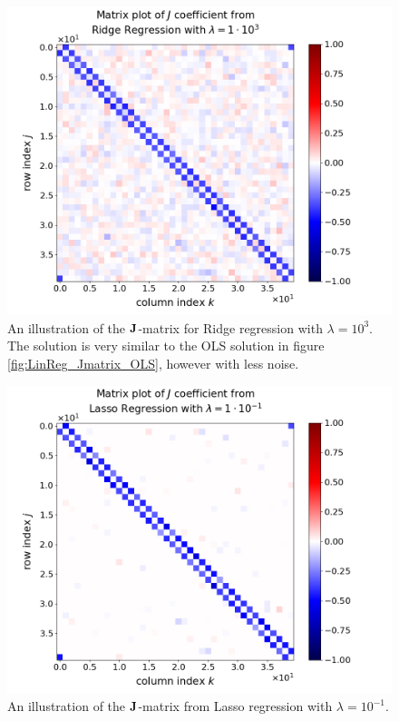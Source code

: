 \documentclass[nofootinbib,reprint,english]{revtex4-1}
\begin{document}
\begin{figure}[ht]
\centering
\includegraphics[scale=0.3]{../output/LinReg/Jmatrix_Ridge2.png}
\caption{An illustration of the \(\vb{J}\)-matrix for Ridge regression with \(\lambda=10^3\). The solution is very similar to the OLS solution in figure \ref{fig:LinReg_Jmatrix_OLS}, however with less noise.}\label{fig:LinReg_Jmatrix_Ridge1}
\end{figure}

\begin{figure}[ht]
\centering
\includegraphics[scale=0.3]{../output/LinReg/Jmatrix_Lasso2.png}
\caption{An illustration of the \(\vb{J}\)-matrix from Lasso regression with \(\lambda=10^{-1}\).}\label{fig:LinReg_Jmatrix_Lasso1}
\end{figure}
\end{document}
